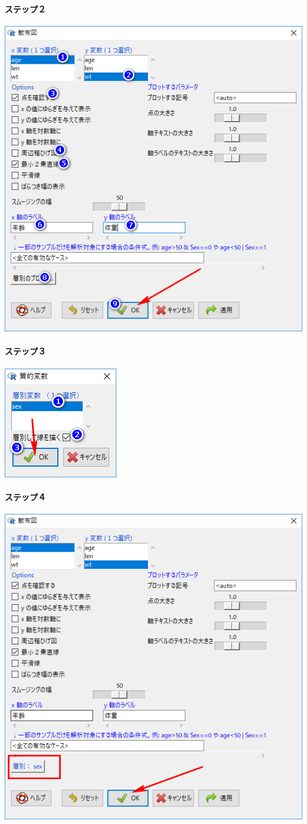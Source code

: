 \documentclass[11pt,]{problemset}
\let\oldparagraph\paragraph
\renewcommand{\paragraph}[1]{\oldparagraph{#1}\mbox{}}
\begin{document}
\hypertarget{-13}{%
\paragraph{ステップ２}\label{-13}}

\begin{center}\includegraphics[width=0.5\linewidth]{pic/scatter04} \end{center}

\hypertarget{-14}{%
\paragraph{ステップ３}\label{-14}}

\begin{center}\includegraphics[width=0.2\linewidth]{pic/scatter05} \end{center}

\hypertarget{-15}{%
\paragraph{ステップ４}\label{-15}}

\begin{center}\includegraphics[width=0.4\linewidth]{pic/scatter06} \end{center}
\end{document}
